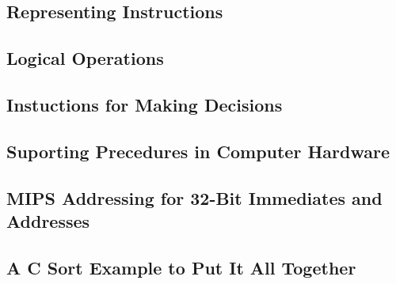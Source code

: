 \subsection{Representing Instructions}
\subsection{Logical Operations}
\subsection{Instuctions for Making Decisions}
\subsection{Suporting Precedures in Computer Hardware}
\subsection{MIPS Addressing for 32-Bit Immediates and Addresses}
\subsection{A C Sort Example to Put It All Together}